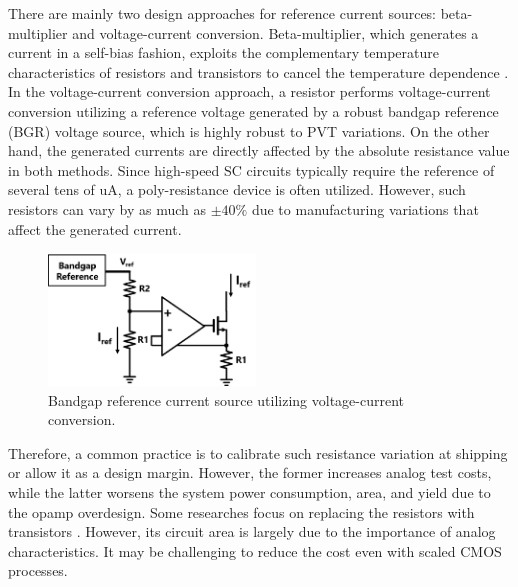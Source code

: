 \documentclass[paper]{ieice}
\begin{document}
There are mainly two design approaches for reference current sources: beta-multiplier and voltage-current conversion. Beta-multiplier, which generates a current in a self-bias fashion, exploits the complementary temperature characteristics of resistors and transistors to cancel the temperature dependence \cite{azcona2014precision, osipov2016temperature}. In the voltage-current conversion approach, a resistor performs voltage-current conversion utilizing a reference voltage generated by a robust bandgap reference (BGR) voltage source, which is highly robust to PVT variations\cite{banba1999cmos, ueno2009300, ueno20101}. On the other hand, the generated currents are directly affected by the absolute resistance value in both methods. Since high-speed SC circuits typically require the reference of several tens of uA, a poly-resistance device is often utilized. However, such resistors can vary by as much as $\pm40\%$ due to manufacturing variations that affect the generated current.

\begin{figure}[!]
\centering
 \includegraphics[width=0.49\textwidth]{figs/fig1.png}
  \caption{Bandgap reference current source utilizing voltage-current conversion.}
\label{bandgap}
\end{figure}

Therefore, a common practice is to calibrate such resistance variation at shipping or allow it as a design margin. However, the former increases analog test costs, while the latter worsens the system power consumption, area, and yield due to the opamp overdesign. Some researches focus on replacing the resistors with transistors \cite{hirose2010nano, hirose2010cmos, osaki20131, choi201423pw}. However, its circuit area is largely due to the importance of analog characteristics. It may be challenging to reduce the cost even with scaled CMOS processes.
\end{document}
